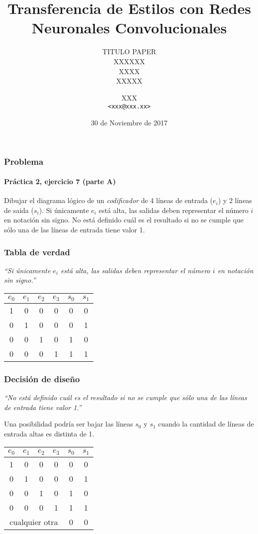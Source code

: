 \documentclass[spanish]{beamer}
\title{Transferencia de Estilos con Redes Neuronales Convolucionales}
\subtitle{
  TITULO PAPER \\
  \vspace{2em}
  XXXXXX \\
  XXXX \\
  XXXXX
}
\author{XXX \\ \footnotesize{\texttt{<xxx@xxx.xx>}}}
\date{30 de Noviembre de 2017}
\institute{
  Departamento de Computación \\
  Facultad de Ciencias Exactas y Naturales \\
  Universidad de Buenos Aires
}
\begin{document}
\begin{frame}
  \titlepage
\end{frame}

\begin{frame}
  \frametitle{Problema}
  \framesubtitle{Práctica 2, ejercicio 7 (parte A)}

  Dibujar el diagrama lógico de un \textit{codificador} de 4 líneas de
  entrada ($e_i$) y 2 líneas de saida ($s_i$). Si únicamente $e_i$ está alta,
  las salidas deben representar el número $i$ en notación sin signo. No está
  definido cuál es el resultado si no se cumple que sólo una de las líneas de
  entrada tiene valor 1.

\end{frame}

\begin{frame}
  \frametitle{Tabla de verdad}

  \textit{``Si únicamente $e_i$ está alta, las salidas deben representar el
  número $i$ en notación sin signo.''}

  \pause

  \begin{center}
    \begin{tabular}{c|c|c|c||c|c}
      $e_0$ & $e_1$ & $e_2$ & $e_3$ & $s_0$ & $s_1$ \\
      \hline
      1 & 0 & 0 & 0 & 0 & 0 \\
      0 & 1 & 0 & 0 & 0 & 1 \\
      0 & 0 & 1 & 0 & 1 & 0 \\
      0 & 0 & 0 & 1 & 1 & 1 \\
    \end{tabular}
  \end{center}
\end{frame}

\begin{frame}
  \frametitle{Decisión de diseño}

  \textit{``No está definido cuál es el resultado si no se cumple que sólo una
  de las líneas de entrada tiene valor 1.''}

  \pause

  \vspace{1em}

  Una posibilidad podría ser bajar las líneas $s_0$ y $s_1$ cuando la cantidad
  de líneas de entrada altas es distinta de 1.

  \pause

  \begin{center}
    \begin{tabular}{c|c|c|c||c|c}
      $e_0$ & $e_1$ & $e_2$ & $e_3$ & $s_0$ & $s_1$ \\
      \hline
      1 & 0 & 0 & 0 & 0 & 0 \\
      0 & 1 & 0 & 0 & 0 & 1 \\
      0 & 0 & 1 & 0 & 1 & 0 \\
      0 & 0 & 0 & 1 & 1 & 1 \\
      \hline
      \multicolumn{4}{c||}{cualquier otra} & 0 & 0 \\
    \end{tabular}
  \end{center}
\end{frame}
\end{document}
